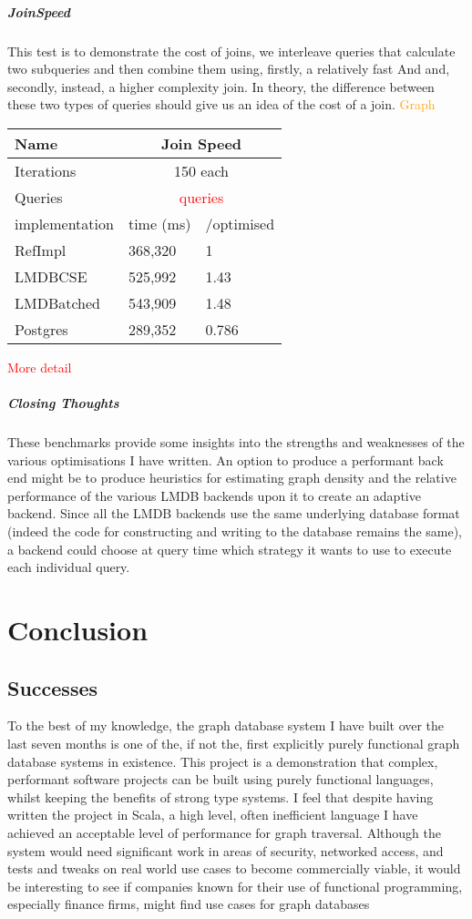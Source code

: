 \documentclass[12pt,a4paper,twoside,openright]{report}
\newcommand\todo[1]{\textcolor{red}{#1}}
\newcommand\diagramNeeded[1]{\textcolor{orange}{#1}}
\newcommand{\reference}{RefImpl}
\newcommand{\batched}{LMDBatched}
\newcommand{\cse}{LMDBCSE}
\newcommand{\postgres}{Postgres}
\newcommand\resultTable[4]{
\begin{center}
	\begin{tabular}{ |p{3cm}||p{3cm}|p{3cm}|  }
 	\hline
 		Name & \multicolumn{2}{|c|}{#1} \\
 	\hline
 		Iterations & \multicolumn{2}{|c|}{#2} \\
 	\hline
 		Queries & \multicolumn{2}{|c|}{#3} \\
 	\hline
 		implementation   	& 	time (ms) & /optimised \\
		#4
 	\hline
	\end{tabular}
\end{center}

}
\begin{document}
{{			\paragraph{JoinSpeed}
				This test is  to demonstrate the cost of joins, we interleave queries that calculate two subqueries and then combine them using, firstly, a relatively fast And and, secondly, instead, a higher complexity join. In theory, the difference between these two types of queries should give us an idea of the cost of a join.
			\diagramNeeded{Graph}
			\resultTable{Join Speed}{150 each}{\todo{queries}}{
			\reference   	& 	368,320 & 1 	\\
 			\cse 			&   525,992 & 1.43   	\\
			\batched 		&	543,909 & 1.48	\\
			\postgres    	&	289,352 & 0.786	\\}
			
						\todo{More detail}
			\paragraph{Closing Thoughts}
			These benchmarks provide some insights into the strengths and weaknesses of the various optimisations I have written. An option to produce a performant back end might be to produce heuristics for estimating graph density and the relative performance of the various LMDB backends upon it to create an adaptive backend. Since all the LMDB backends use the same underlying database format (indeed the code for constructing and writing to the database remains the same), a backend could choose at query time which strategy it wants to use to execute each individual query.


	
\chapter{Conclusion}

\section{Successes}
To the best of my knowledge, the graph database system I have built over the last seven months is one of the, if not the, first explicitly purely functional graph database systems in existence. This project is a demonstration that complex, performant software projects can be built using purely functional languages, whilst keeping the benefits of strong type systems. I feel that despite having written the project in Scala, a high level, often inefficient language I have achieved an acceptable level of performance for graph traversal. Although the system would need significant work in areas of security, networked access, and tests and tweaks on real world use cases to become commercially viable, it would be interesting to see if companies known for their use of functional programming, especially finance firms, might find use cases for graph databases

}}
\end{document}
